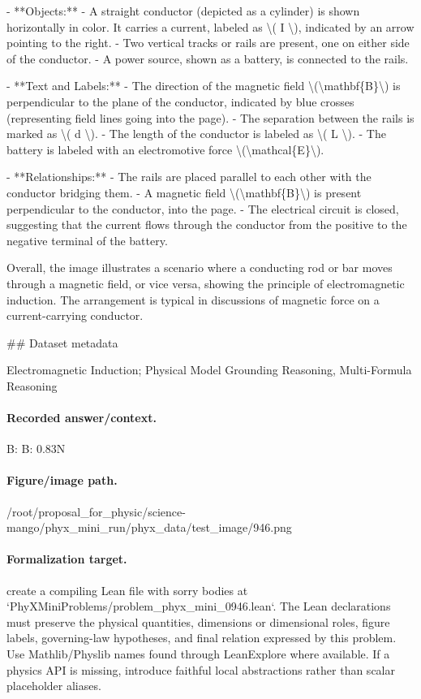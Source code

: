 - **Objects:**
  - A straight conductor (depicted as a cylinder) is shown horizontally in color. It carries a current, labeled as \textbackslash{}( I \textbackslash{}), indicated by an arrow pointing to the right.
  - Two vertical tracks or rails are present, one on either side of the conductor.
  - A power source, shown as a battery, is connected to the rails.
  
- **Text and Labels:**
  - The direction of the magnetic field \textbackslash{}(\textbackslash{}mathbf\{B\}\textbackslash{}) is perpendicular to the plane of the conductor, indicated by blue crosses (representing field lines going into the page).
  - The separation between the rails is marked as \textbackslash{}( d \textbackslash{}).
  - The length of the conductor is labeled as \textbackslash{}( L \textbackslash{}).
  - The battery is labeled with an electromotive force \textbackslash{}(\textbackslash{}mathcal\{E\}\textbackslash{}).

- **Relationships:**
  - The rails are placed parallel to each other with the conductor bridging them.
  - A magnetic field \textbackslash{}(\textbackslash{}mathbf\{B\}\textbackslash{}) is present perpendicular to the conductor, into the page.
  - The electrical circuit is closed, suggesting that the current flows through the conductor from the positive to the negative terminal of the battery.

Overall, the image illustrates a scenario where a conducting rod or bar moves through a magnetic field, or vice versa, showing the principle of electromagnetic induction. The arrangement is typical in discussions of magnetic force on a current-carrying conductor.

\#\# Dataset metadata

Electromagnetic Induction; Physical Model Grounding Reasoning, Multi-Formula Reasoning

\paragraph{Recorded answer/context.}
B: B: 0.83N

\paragraph{Figure/image path.}
/root/proposal\_for\_physic/science-mango/phyx\_mini\_run/phyx\_data/test\_image/946.png

\paragraph{Formalization target.}
create a compiling Lean file with sorry bodies at `PhyXMiniProblems/problem\_phyx\_mini\_0946.lean`. The Lean declarations must preserve the physical quantities, dimensions or dimensional roles, figure labels, governing-law hypotheses, and final relation expressed by this problem.
Use Mathlib/Physlib names found through LeanExplore where available. If a physics API is missing, introduce faithful local abstractions rather than scalar placeholder aliases.

